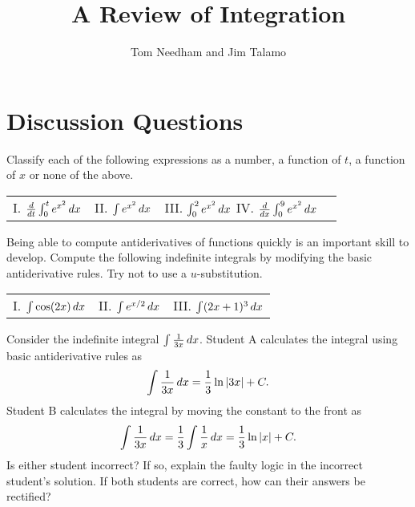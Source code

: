 \documentclass[handout,hints]{ximera}
\author{Tom Needham and Jim Talamo}
\title[]{A Review of Integration}
\begin{document}
\begin{abstract}
\end{abstract}
\maketitle

\vspace{-0.9in}

\section{Discussion Questions}

\begin{problem}
Classify each of the following expressions as a number, a function of $t$, a function of $x$ or none of the above.


\begin{tabular}{llll}
I. $\frac{\mathop{}\!d}{\mathop{}\!d t} \int_0^t e^{x^2} \mathop{}\!d x$ \hspace{0.2in} & II. $\int e^{x^2} \mathop{}\!d x$ \hspace{0.2in} & III. $\int_0^2 e^{x^2} \mathop{}\!d x$ \hspace{0.2in}
IV. $\frac{d}{dx} \int_0^9 e^{x^2} \mathop{}\!d x$
\end{tabular}

\end{problem}

\begin{problem}
Being able to compute antiderivatives of functions quickly is an important skill to develop.  Compute the following indefinite integrals by modifying the basic antiderivative rules.  Try not to use a $u$-substitution.

\begin{center}
\begin{tabular}{lll} 
I. $\int \cos(2x) \mathop{}\!d x$ \hspace{.7in} & II. $\int e^{x/2} \mathop{}\!d x$ \hspace{.7in} & III. $\int (2x+1)^3 \mathop{}\!d x$
\end{tabular}
\end{center}

\end{problem}

\begin{problem}
Consider the indefinite integral $\int \frac{1}{3x} \mathop{}\!d x$. Student A calculates the integral using basic antiderivative rules as
$$
\int \frac{1}{3x} \mathop{}\!d x = \frac{1}{3} \ln |3x| + C.
$$
Student B calculates the integral by moving the constant to the front as 
$$
\int \frac{1}{3x} \mathop{}\!d x = \frac{1}{3} \int \frac{1}{x} \mathop{}\!d x = \frac{1}{3} \ln |x| + C.
$$
Is either student incorrect?  If so, explain the faulty logic in the incorrect student's solution.  If both students are correct, how can their answers be rectified?

\end{problem}
\end{document}
